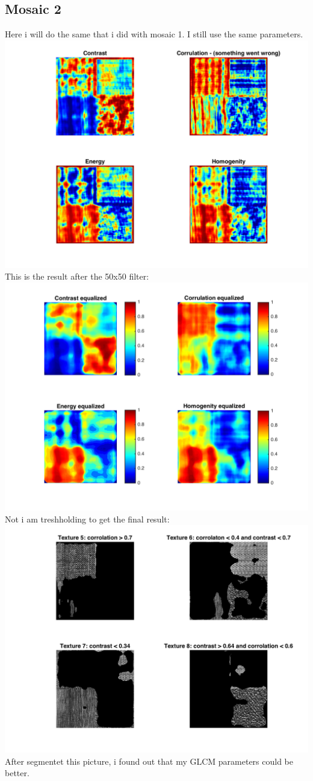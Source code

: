 \documentclass{article}
\begin{document}
\subsection{Mosaic 2}
Here i will do the same that i did with mosaic 1. I still use the same parameters.
\\
\includegraphics[totalheight=8cm]{img2plot.png}\\
This is the result after the 50x50 filter:
\\
\includegraphics[totalheight=8cm]{img2eplot.png}
\\
Not i am treshholding to get the final result:\\
\includegraphics[totalheight=10cm]{img2tplot.png}
After segmentet this picture, i found out that my GLCM parameters could be better. 
\end{document}
